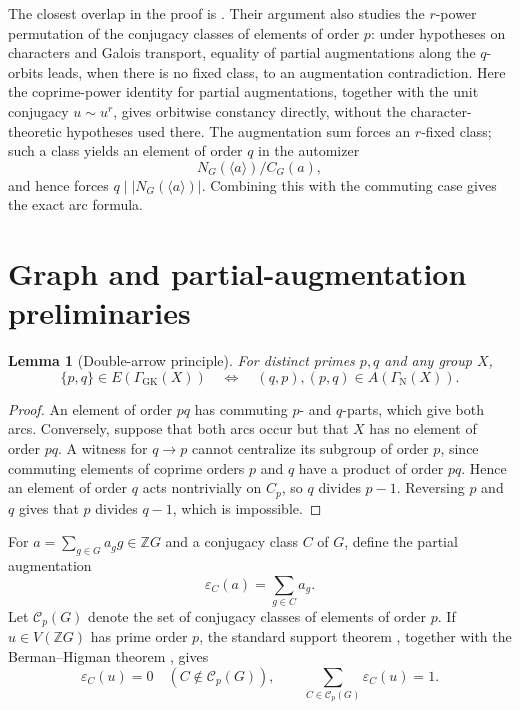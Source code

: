 \documentclass[11pt,a4paper]{article}
\newtheorem{lemma}[theorem]{Lemma}
\theoremstyle{remark}
\newcommand{\VZG}{V(\mathbb ZG)}
\newcommand{\GN}{\Gamma_{\mathrm N}}
\newcommand{\GGK}{\Gamma_{\mathrm{GK}}}
\newcommand{\eps}{\varepsilon}
\begin{document}
The closest overlap in the proof is \cite[Lemma~4.2]{PRV}. Their argument
also studies the $r$-power permutation of the conjugacy classes of elements
of order $p$: under hypotheses on characters and Galois transport, equality
of partial augmentations along the $q$-orbits leads, when there is no fixed
class, to an augmentation contradiction. Here the coprime-power identity
for partial augmentations, together with the unit conjugacy $u\sim u^r$,
gives orbitwise constancy directly, without the character-theoretic
hypotheses used there. The augmentation sum forces an $r$-fixed
class; such a class yields an element of order $q$ in the automizer
\[
 N_G(\langle a\rangle)/C_G(a),
\]
and hence forces $q\mid |N_G(\langle a\rangle)|$. Combining this with the
commuting case gives the exact arc formula.

\section{Graph and partial-augmentation preliminaries}

\begin{lemma}[Double-arrow principle]\label{lem:double}
For distinct primes $p,q$ and any group $X$,
\[
 \{p,q\}\in E(\GGK(X))
 \quad\Longleftrightarrow\quad
 (q,p),(p,q)\in A(\GN(X)).
\]
\end{lemma}

\begin{proof}
An element of order $pq$ has commuting $p$- and $q$-parts, which give both
arcs. Conversely, suppose that both arcs occur but that $X$ has no element
of order $pq$. A witness for $q\to p$ cannot centralize its subgroup of
order $p$, since commuting elements of coprime orders $p$ and $q$ have a
product of order $pq$. Hence an element of order $q$ acts nontrivially on
$C_p$, so $q$ divides $p-1$. Reversing $p$ and $q$ gives that $p$ divides
$q-1$, which is impossible.
\end{proof}

For $a=\sum_{g\in G}a_g g\in\mathbb ZG$ and a conjugacy class $C$ of $G$,
define the partial augmentation
\[
 \eps_C(a)=\sum_{g\in C}a_g.
\]
Let $\mathcal C_p(G)$ denote the set of conjugacy classes of elements of
order $p$. If $u\in\VZG$ has prime order $p$, the standard support theorem
\cite[Theorem~2.3]{Hertweck}, together with the Berman--Higman theorem
\cite[Proposition~(1.4)]{Sehgal}, gives
\begin{equation}\label{eq:support}
 \eps_C(u)=0\quad(C\notin\mathcal C_p(G)),
 \qquad
 \sum_{C\in\mathcal C_p(G)}\eps_C(u)=1.
\end{equation}
\end{document}
